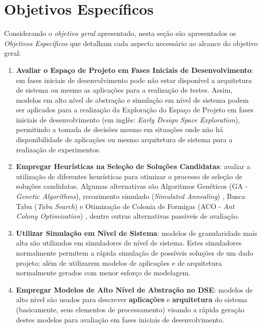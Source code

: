 \documentclass[tese-proposta,nocipinfo]{texufpel}
\begin{document}
\section{Objetivos Específicos}
Considerando o \textit{objetivo geral} apresentado, nesta seção são apresentados os \textit{Objetivos Específicos} que detalham cada aspecto necessário ao alcance do objetivo geral:
\begin{enumerate}
\item \textbf{\label{Avaliar o Espaço de Projeto em Fases Iniciais de Desenvolvimento}Avaliar o Espaço de Projeto em Fases Iniciais de Desenvolvimento}: em fases iniciais de desenvolvimento pode não estar disponível a arquitetura de sistema ou mesmo as aplicações para a realização de testes. Assim, modelos em alto nível de abstração e simulação em nível de sistema podem ser aplicados para a realização da Exploração do Espaço de Projeto em fases iniciais de desenvolvimento (em inglês: \textit{Early Design Space Exploration}), permitindo a tomada de decisões mesmo em situações onde não há disponibilidade de aplicações ou mesmo arquitetura de sistema para a realização de experimentos.
\item \textbf{\label{Empregar Heurísticas na Seleção de Soluções Candidatas}Empregar Heurísticas na Seleção de Soluções Candidatas}: avaliar a utilização de diferentes heurísticas para otimizar o processo de seleção de soluções candidatas. Algumas alternativas são Algoritmos Genéticos (GA - \textit{Genetic Algorithms})\cite{Reeves2010_GA}, recozimento simulado (\textit{Simulated Annealing}) \cite{Nikolaev2010_Simul_Anneal}, Busca Tabu (\textit{Tabu Search}) \cite{Gendreau2010_Tabu}  e Otimização de Colonia de Formigas (ACO - \textit{Ant Colony Optimization}) \cite{Dorigo2010_ACO}, dentre outras alternativas passíveis de avaliação.
\item \textbf{\label{Utilizar Simulação em Nível de Sistema}Utilizar Simulação em Nível de Sistema}: modelos de granularidade mais alta são utilizados em simuladores de nível de sistema. Estes simuladores normalmente permitem a rápida simulação de possíveis soluções de um dado projeto; além de utilizarem modelos de aplicações e de arquitetura normalmente gerados com menor esforço de modelagem.
\item \textbf{\label{Empregar Modelos de Alto Nível de Abstração no DSE}Empregar Modelos de Alto Nível de Abstração no DSE}: modelos de alto nível são usados para descrever \textbf{aplicações} e \textbf{arquitetura} do sistema (basicamente, seus elementos de processamento) visando a rápida geração destes modelos para avaliação em fases iniciais de desenvolvimento. %

\end{enumerate}
\end{document}

